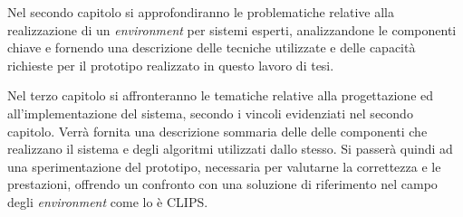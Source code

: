 Nel secondo capitolo si approfondiranno le problematiche relative alla realizzazione di un \emph{environment} per sistemi esperti, analizzandone le componenti chiave e fornendo una descrizione delle tecniche utilizzate e delle capacità richieste per il prototipo realizzato in questo lavoro di tesi.

Nel terzo capitolo  si affronteranno le tematiche relative alla progettazione ed all'implementazione del sistema, secondo i vincoli evidenziati nel secondo capitolo. Verrà fornita una descrizione sommaria delle delle componenti che realizzano il sistema e degli algoritmi utilizzati dallo stesso. Si passerà quindi ad una sperimentazione del prototipo, necessaria per valutarne la correttezza e le prestazioni, offrendo un confronto con una soluzione di riferimento nel campo degli \emph{environment} come lo è CLIPS.